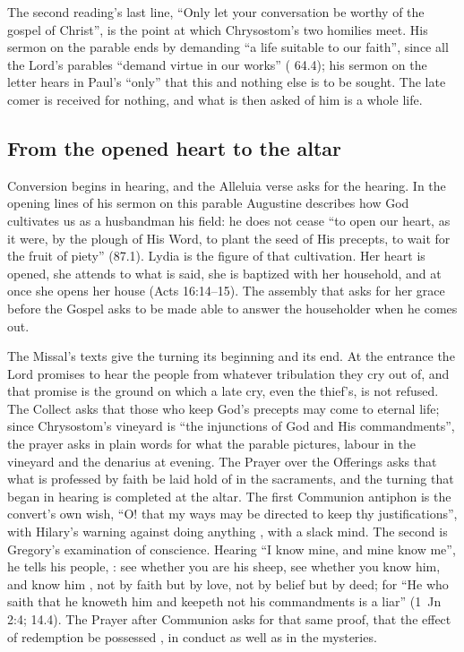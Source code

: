 The second reading's last line, ``Only let your conversation be worthy of the gospel
of Christ'', is the point at which Chrysostom's two homilies meet. His sermon
on the parable ends by demanding ``a life suitable to our faith'', since all
the Lord's parables ``demand virtue in our works'' (
64.4); his sermon on the letter hears in Paul's ``only'' that this and nothing
else is to be sought. The late comer is received for nothing, and what is then
asked of him is a whole life.

\subsection{From the opened heart to the altar}

Conversion begins in hearing, and the Alleluia verse asks for the hearing. In
the opening lines of his sermon on this parable Augustine describes how God
cultivates us as a husbandman his field: he does not cease ``to open our
heart, as it were, by the plough of His Word, to plant the seed of His
precepts, to wait for the fruit of piety'' (87.1). Lydia is the figure of that
cultivation. Her heart is opened, she attends to what is said, she is baptized
with her household, and at once she opens her house (Acts 16:14--15). The
assembly that asks for her grace before the Gospel asks to be made able to
answer the householder when he comes out.

The Missal's texts give the turning its beginning and its end. At the
entrance the Lord promises to hear the people from whatever tribulation they
cry out of, and that promise is the ground on which a late cry, even the
thief's, is not refused. The Collect asks that those who keep God's precepts
may come to eternal life; since Chrysostom's vineyard is ``the injunctions of
God and His commandments'', the prayer asks in plain words for what the
parable pictures, labour in the vineyard and the denarius at evening. The
Prayer over the Offerings asks that what is professed by faith be laid hold of
in the sacraments, and the turning that began in hearing is completed at the
altar. The first Communion antiphon is the convert's own wish, ``O! that my
ways may be directed to keep thy justifications'', with Hilary's warning
against doing anything , with a slack mind. The second
is Gregory's examination of conscience. Hearing ``I know mine, and mine know
me'', he tells his people, : see whether you
are his sheep, see whether you know him, and know him , not by faith
but by love, not by belief but by deed; for ``He who saith
that he knoweth him and keepeth not his commandments is a liar'' (1~Jn 2:4;
 14.4). The Prayer after Communion asks for that
same proof, that the effect of redemption be possessed , in
conduct as well as in the mysteries.

